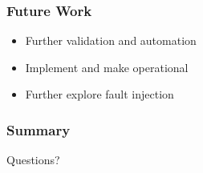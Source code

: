 \documentclass[aspectratio=169]{beamer}
\begin{document}
\begin{frame}
  \frametitle{Future Work}
  \begin{itemize}
  \item{Further validation and automation}
  \item{Implement and make operational}
  \item{Further explore fault injection}
  \end{itemize}
\end{frame}


\begin{frame}
  \frametitle{Summary}
  \tableofcontents
\end{frame}


\begin{frame}
  \centering
  \Huge Questions?
\end{frame}


\frame[allowframebreaks]{
  
  
} 
 
\end{document}
